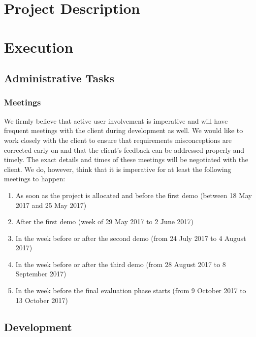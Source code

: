 \documentclass{article}
\begin{document}
\cleardoublepage
\thispagestyle{empty}
\tableofcontents
\newpage

\section{Project Description}
    \lipsum[1]
    
    \lipsum[2]

\section{Execution}
    \subsection{Administrative Tasks}
        \subsubsection{Meetings}
            We firmly believe that active user involvement is imperative and will have frequent meetings with the client during development as well. We would like to work closely with the client to ensure that requirements misconceptions are corrected early on and that the client's feedback can be addressed properly and timely. The exact details and times of these meetings will be negotiated with the client. We do, however, think that it is imperative for at least the following meetings to happen:
            \begin{enumerate}
                \item As soon as the project is allocated and before the first demo (between 18 May 2017 and 25 May 2017)
                \item After the first demo (week of 29 May 2017 to 2 June 2017)
                \item In the week before or after the second demo (from 24 July 2017 to 4 August 2017)
                \item In the week before or after the third demo (from 28 August 2017 to 8 September 2017)
                \item In the week before the final evaluation phase starts (from 9 October 2017 to 13 October 2017)
            \end{enumerate}
    \subsection{Development}
\end{document}
